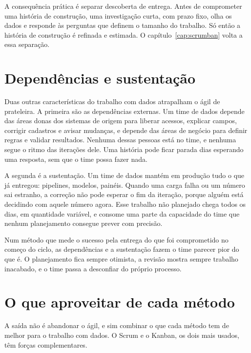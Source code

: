A consequência prática é separar descoberta de entrega. Antes de comprometer uma história de
construção, uma investigação curta, com prazo fixo, olha os dados e responde às perguntas que
definem o tamanho do trabalho. Só então a história de construção é refinada e estimada. O
capítulo~\ref{cap:scrumban} volta a essa separação.

\section{Dependências e sustentação}
\label{sec:dependencias}

Duas outras características do trabalho com dados atrapalham o ágil de prateleira. A primeira
são as dependências externas. Um time de dados depende das áreas donas dos sistemas de origem
para liberar acessos, explicar campos, corrigir cadastros e avisar mudanças, e depende das
áreas de negócio para definir regras e validar resultados. Nenhuma dessas pessoas está no time,
e nenhuma segue o ritmo das iterações dele. Uma história pode ficar parada dias esperando uma
resposta, sem que o time possa fazer nada.

A segunda é a sustentação. Um time de dados mantém em produção tudo o que já entregou:
pipelines, modelos, painéis. Quando uma carga falha ou um número sai estranho, a correção não
pode esperar o fim da iteração, porque alguém está decidindo com aquele número agora. Esse
trabalho não planejado chega todos os dias, em quantidade variável, e consome uma parte da
capacidade do time que nenhum planejamento consegue prever com precisão.

Num método que mede o sucesso pela entrega do que foi comprometido no começo do ciclo, as
dependências e a sustentação fazem o time parecer pior do que é. O planejamento fica sempre
otimista, a revisão mostra sempre trabalho inacabado, e o time passa a desconfiar do próprio
processo.


\section{O que aproveitar de cada método}
\label{sec:aproveitar}

A saída não é abandonar o ágil, e sim combinar o que cada método tem de melhor para o trabalho
com dados. O Scrum e o Kanban, os dois mais usados, têm forças complementares.

